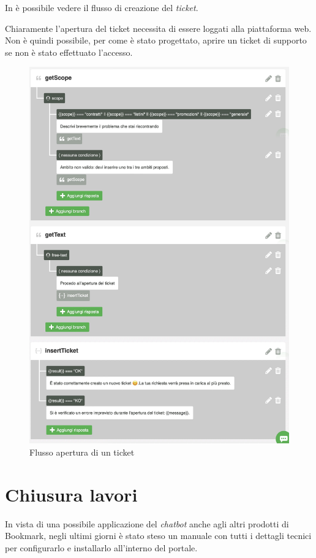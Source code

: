 In  è possibile vedere il flusso di creazione del \textit{ticket}. 

Chiaramente l'apertura del ticket necessita di essere loggati alla piattaforma web. 
%
Non è quindi possibile, per come è stato progettato, aprire un ticket di supporto se non è stato effettuato l'accesso.

\begin{figure}
    \centering{}
    \includegraphics*[width=\textwidth]{./img/ticket-flow.png}
    \caption{Flusso apertura di un ticket}
    \label{fig:ticket-flow}
\end{figure}


\section{Chiusura lavori}
In vista di una possibile applicazione del \textit{chatbot} anche agli altri prodotti di Bookmark, negli ultimi giorni è stato steso un manuale con tutti i dettagli tecnici per configurarlo e installarlo all'interno del portale.
